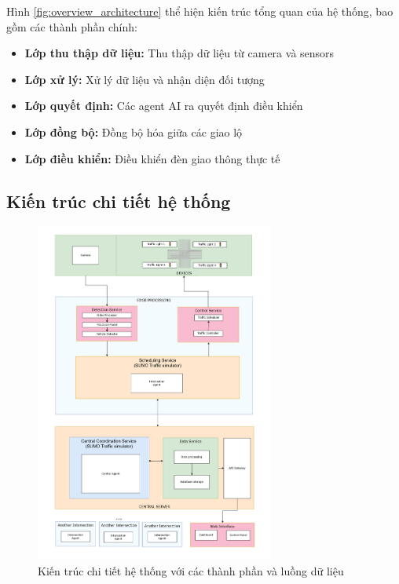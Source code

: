 Hình \ref{fig:overview_architecture} thể hiện kiến trúc tổng quan của hệ thống,
bao gồm các thành phần chính:

\begin{itemize}
    \item \textbf{Lớp thu thập dữ liệu:} Thu thập dữ liệu từ camera và sensors

    \item \textbf{Lớp xử lý:} Xử lý dữ liệu và nhận diện đối tượng

    \item \textbf{Lớp quyết định:} Các agent AI ra quyết định điều khiển

    \item \textbf{Lớp đồng bộ:} Đồng bộ hóa giữa các giao lộ

    \item \textbf{Lớp điều khiển:} Điều khiển đèn giao thông thực tế
\end{itemize}

\subsection{Kiến trúc chi tiết hệ thống}

\begin{figure}[!htp]
    \centering
    \includegraphics[width=0.7\textwidth]{img/detailed_architecture.png}
    \caption{Kiến trúc chi tiết hệ thống với các thành phần và luồng dữ liệu}
    \label{fig:detailed_architecture}
\end{figure}

